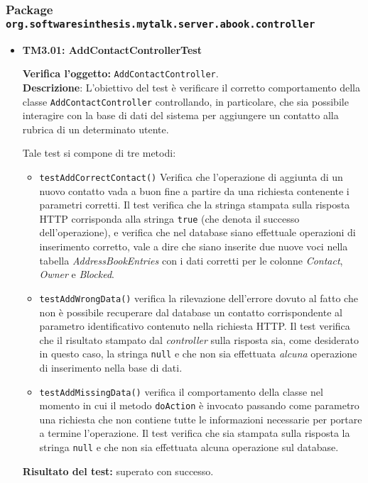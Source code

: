 \subsubsection{Package \texttt{org.softwaresinthesis.mytalk.server.abook.controller}}
\begin{itemize}

\item \textbf{TM3.01: AddContactControllerTest}

\textbf{Verifica l'oggetto:} \texttt{AddContactController}.\\
\textbf{Descrizione}: L'obiettivo del test è verificare il corretto comportamento della classe \texttt{AddContactController} controllando, in particolare, che sia possibile interagire con la base di dati del sistema per aggiungere un contatto alla rubrica di un determinato utente.

Tale test si compone di tre metodi:
\begin{itemize}
\item \texttt{testAddCorrectContact()} Verifica che l'operazione di aggiunta di un nuovo contatto vada a buon fine a partire da una richiesta contenente i parametri corretti. Il test verifica che la stringa stampata sulla risposta HTTP corrisponda alla stringa \texttt{true} (che denota il successo dell'operazione), e verifica che nel database siano effettuale operazioni di inserimento corretto, vale a dire che siano inserite due nuove voci nella tabella \textit{AddressBookEntries} con i dati corretti per le colonne \textit{Contact}, \textit{Owner} e \textit{Blocked}.

\item \texttt{testAddWrongData()} verifica la rilevazione dell'errore dovuto al fatto che non è possibile recuperare dal database un contatto corrispondente al parametro identificativo contenuto nella richiesta HTTP. Il test verifica che il risultato stampato dal \textit{controller} sulla risposta sia, come desiderato in questo caso, la stringa \texttt{null} e che non sia effettuata \textit{alcuna} operazione di inserimento nella base di dati.

\item \texttt{testAddMissingData()} verifica il comportamento della classe nel momento in cui il metodo \texttt{doAction} è invocato passando come parametro una richiesta che non contiene tutte le informazioni necessarie per portare a termine l'operazione. Il test verifica che sia stampata sulla risposta la stringa \texttt{null} e che non sia effettuata alcuna operazione sul database.
\end{itemize}
\textbf{Risultato del test:} superato con successo.



\end{itemize}
